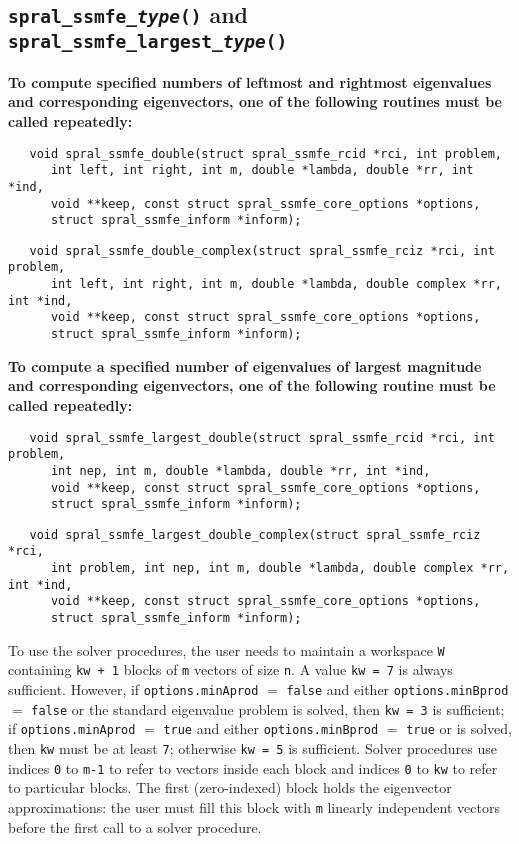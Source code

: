 \subsection{\texttt{spral\_ssmfe\_\textit{type}()} and \texttt{spral\_ssmfe\_largest\_\textit{type}()}} \label{ssmfe_core:fn:ssmfe}

{\bf
To compute specified numbers
of leftmost and rightmost eigenvalues 
and corresponding eigenvectors,
one of the following routines must be called repeatedly:
}

\begin{verbatim}
   void spral_ssmfe_double(struct spral_ssmfe_rcid *rci, int problem,
      int left, int right, int m, double *lambda, double *rr, int *ind,
      void **keep, const struct spral_ssmfe_core_options *options,
      struct spral_ssmfe_inform *inform);
\end{verbatim}
\begin{verbatim}
   void spral_ssmfe_double_complex(struct spral_ssmfe_rciz *rci, int problem,
      int left, int right, int m, double *lambda, double complex *rr, int *ind,
      void **keep, const struct spral_ssmfe_core_options *options,
      struct spral_ssmfe_inform *inform);
\end{verbatim}


\medskip
\noindent
{\bf
To compute a specified number
of eigenvalues of largest magnitude 
and corresponding eigenvectors,
one of the following routine must be called repeatedly:
}

\begin{verbatim}
   void spral_ssmfe_largest_double(struct spral_ssmfe_rcid *rci, int problem,
      int nep, int m, double *lambda, double *rr, int *ind,
      void **keep, const struct spral_ssmfe_core_options *options,
      struct spral_ssmfe_inform *inform);
\end{verbatim}
\begin{verbatim}
   void spral_ssmfe_largest_double_complex(struct spral_ssmfe_rciz *rci,
      int problem, int nep, int m, double *lambda, double complex *rr, int *ind,
      void **keep, const struct spral_ssmfe_core_options *options,
      struct spral_ssmfe_inform *inform);
\end{verbatim}

\medskip
\noindent
To use the solver procedures,
the user needs to maintain a workspace {\tt W} containing
{\tt kw + 1} blocks of {\tt m} vectors of size {\tt n}.
A value {\tt kw = 7} is always sufficient. 
However, if {\tt options.minAprod} $=$ {\tt false}
and either {\tt options.minBprod} $=$ {\tt false} or 
the standard eigenvalue problem  is solved,
then {\tt kw = 3} is sufficient; 
if 
{\tt options.minAprod} $=$ {\tt true} and
either {\tt options.minBprod} $=$ {\tt true} or
 is solved,
then {\tt kw} must be at least {\tt 7};
otherwise {\tt kw = 5} is sufficient.
Solver procedures
use indices {\tt 0} to {\tt m-1} 
to refer to vectors inside each block
and indices {\tt 0} to {\tt kw} 
to refer to particular blocks.
The first (zero-indexed) block holds the eigenvector approximations:
the user must fill this block with 
{\tt m} linearly independent vectors before the first call
to a solver procedure.

